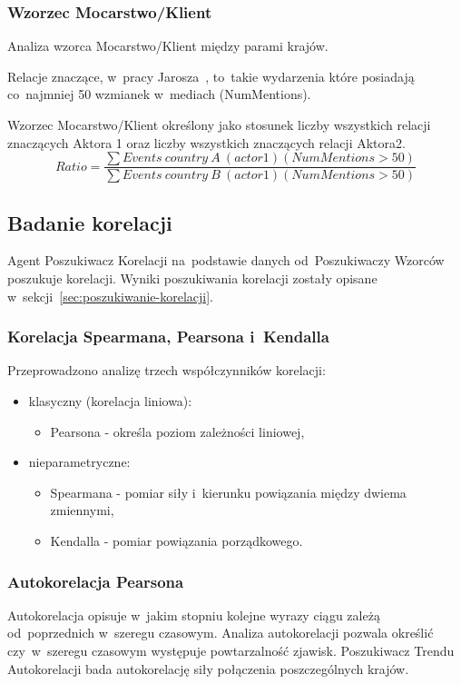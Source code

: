 \documentclass[11pt]{report}
\begin{document}
    \subsubsection{Wzorzec Mocarstwo/Klient}
    Analiza wzorca Mocarstwo/Klient między parami krajów.

    Relacje znaczące, w~pracy Jarosza~\cite{Jarosz2020}, to~takie wydarzenia które posiadają co~najmniej 50 wzmianek w~mediach (NumMentions). %

    Wzorzec Mocarstwo/Klient określony jako stosunek liczby wszystkich relacji znaczących Aktora 1 oraz liczby wszystkich znaczących relacji Aktora2. %
    \[ Ratio = \frac
    {\sum{Events\ country\ A\ (actor 1) (NumMentions > 50)}}
    {\sum{Events\ country\ B\ (actor 1) (NumMentions > 50)}}
    \]

    \subsection{Badanie korelacji}
    Agent Poszukiwacz Korelacji na~podstawie danych od~Poszukiwaczy Wzorców poszukuje korelacji.
    Wyniki poszukiwania korelacji zostały opisane w~sekcji~\ref{sec:poszukiwanie-korelacji}.

    \subsubsection{Korelacja Spearmana, Pearsona i~Kendalla}

    Przeprowadzono analizę trzech współczynników korelacji:
    \begin{itemize}
        \item klasyczny (korelacja liniowa):
        \begin{itemize}
            \item Pearsona - określa poziom zależności liniowej,
        \end{itemize}
        \item nieparametryczne:
        \begin{itemize}
            \item Spearmana - pomiar siły i~kierunku powiązania między dwiema zmiennymi,
            \item Kendalla - pomiar powiązania porządkowego.
        \end{itemize}
    \end{itemize}

    \subsubsection{Autokorelacja Pearsona}
    Autokorelacja opisuje w~jakim stopniu kolejne wyrazy ciągu zależą od~poprzednich w~szeregu czasowym.
    Analiza autokorelacji pozwala określić czy~w~szeregu czasowym występuje powtarzalność zjawisk.
    Poszukiwacz Trendu Autokorelacji bada autokorelację siły połączenia poszczególnych krajów.
\end{document}
